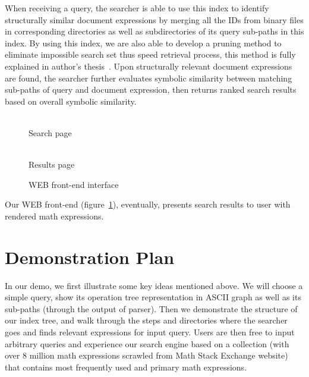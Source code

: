 \documentclass{llncs}
\begin{document}
When receiving a query, the searcher is able to use this index to identify structurally similar document expressions by merging all the IDs from binary files in corresponding directories as well as subdirectories of its query sub-paths in this index.
By using this index, we are also able to develop a pruning method to eliminate impossible search set thus speed retrieval process, 
this method is fully explained in author's thesis~\cite{mythesis}.
Upon structurally relevant document expressions are found, the searcher further evaluates symbolic similarity between matching sub-paths of query and document expression, then returns ranked search results based on overall symbolic similarity.
\begin{figure}
\begin{minipage}[b]{2.10in}
\begin{center}
\\ Search page
\end{center}
\end{minipage}
\hspace*{0in}
\begin{minipage}[b]{2.20in}
\begin{center}
\\ Results page
\end{center}
\end{minipage}
\caption{WEB front-end interface}\label{frontEnd}
\end{figure}

Our WEB front-end (figure~\ref{frontEnd}), eventually, presents search results to user with rendered math expressions.

\section{Demonstration Plan}
In our demo, we first illustrate some key ideas mentioned above.
 We will choose a simple query, show its operation tree representation in ASCII graph as well as its sub-paths (through the output of parser).
 Then we demonstrate the structure of our index tree, and walk through the steps and directories where the searcher goes and finds relevant expressions for input query.
 Users are then free to input arbitrary queries and experience our search engine based on a collection (with over 8 million math expressions scrawled from Math Stack Exchange website) that contains most frequently used and primary math expressions.
\end{document}
